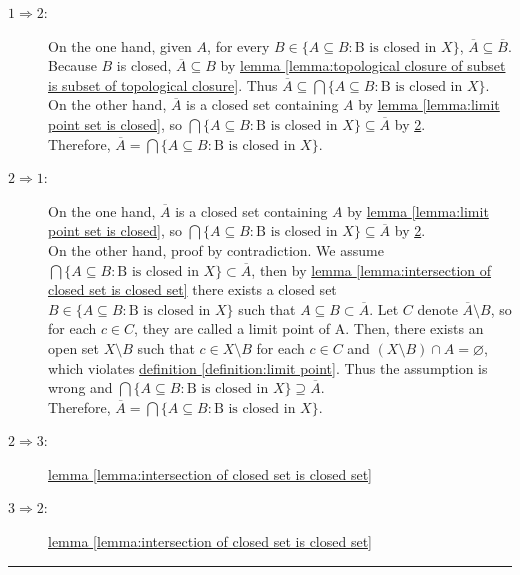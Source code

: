 \documentclass[12pt]{article}
\numberwithin{equation}{section}
\theoremstyle{plain} %
\theoremstyle{definition}
\theoremstyle{remark}
\newenvironment{proof}{{\bf Proof:}}{\hfill\rule{2mm}{2mm}}
\begin{document}
\begin{proof}
\begin{description}
	\item[$1 \Rightarrow 2$:] On the one hand, given $A$, for every $B \in \{A \subseteq B: \text{B is closed in }X\}$, $\overline{A} \subseteq \overline{B}$. Because $B$ is closed, $\overline{A} \subseteq {B}$ by \hyperref[lemma:topological closure of subset is subset of topological closure]{lemma \ref*{lemma:topological closure of subset is subset of topological closure}}. Thus $\overline{A} \subseteq \bigcap \{A \subseteq B: \text{B is closed in }X\}$. \\
	On the other hand, $\overline{A}$ is a closed set containing $A$ by \hyperref[lemma:limit point set is closed]{lemma \ref*{lemma:limit point set is closed}}, so $\bigcap \{A \subseteq B: \text{B is closed in }X\} \subseteq \overline{A}$ by \hyperref[definition:closure 2]{2}. \\
	Therefore, $\overline{A} = \bigcap \{A \subseteq B: \text{B is closed in }X\}$. 
	\item[$2 \Rightarrow 1$:] On the one hand, $\overline{A}$ is a closed set containing $A$ by \hyperref[lemma:limit point set is closed]{lemma \ref*{lemma:limit point set is closed}}, so $\bigcap \{A \subseteq B: \text{B is closed in }X\} \subseteq \overline{A}$ by \hyperref[definition:closure 2]{2}. \\
	On the other hand, proof by contradiction. We assume $\bigcap \{A \subseteq B: \text{B is closed in }X\} \subset \overline{A}$, then by \hyperref[lemma:intersection of closed set is closed set]{lemma \ref*{lemma:intersection of closed set is closed set}} there exists a closed set $B \in \{A \subseteq B: \text{B is closed in }X\}$ such that $A \subseteq B \subset \overline{A}$. Let $C$ denote $\overline{A} \setminus B$, so for each $c \in C$, they are called a limit point of A. Then, there exists an open set $X \setminus B$ such that $c \in X \setminus B$ for each $c \in C$ and $(X \setminus B) \cap A = \varnothing$, which violates \hyperref[definition:limit point]{definition \ref*{definition:limit point}}. Thus the assumption is wrong and $\bigcap \{A \subseteq B: \text{B is closed in }X\} \supseteq \overline{A}$.\\
	Therefore, $\overline{A} = \bigcap \{A \subseteq B: \text{B is closed in }X\}$. 
	\item[$2 \Rightarrow 3$:] \hyperref[lemma:intersection of closed set is closed set]{lemma \ref*{lemma:intersection of closed set is closed set}} 
	\item[$3 \Rightarrow 2$:] \hyperref[lemma:intersection of closed set is closed set]{lemma \ref*{lemma:intersection of closed set is closed set}} 
\end{description}
\end{proof}
\end{document}
